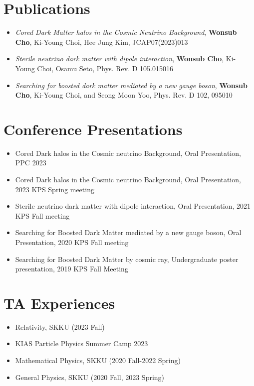\documentclass{article}
\begin{document}
\section{Publications}
\begin{itemize}
    \item \emph{Cored Dark Matter halos in the Cosmic Neutrino Background}, \textbf{Wonsub Cho}, Ki-Young Choi, Hee Jung Kim, JCAP07(2023)013
	\item \emph{Sterile neutrino dark matter with dipole interaction}, \textbf{Wonsub Cho}, Ki-Young Choi, Osamu Seto, Phys. Rev. D 105.015016
	\item \emph{Searching for boosted dark matter mediated by a new gauge boson}, \textbf{Wonsub Cho}, Ki-Young Choi, and Seong Moon Yoo, Phys. Rev. D 102, 095010
\end{itemize}

\section{Conference Presentations}
    \begin{itemize}
    \item Cored Dark halos in the Cosmic neutrino Background, Oral Presentation, PPC 2023
    \item Cored Dark halos in the Cosmic neutrino Background, Oral Presentation, 2023 KPS Spring meeting
    \item Sterile neutrino dark matter with dipole interaction, Oral Presentation, 2021 KPS Fall meeting
    \item Searching for Boosted Dark Matter mediated by a new gauge boson, Oral Presentation, 2020 KPS Fall meeting
    \item Searching for Boosted Dark Matter by cosmic ray, Undergraduate poster presentation, 2019 KPS Fall Meeting
    \end{itemize}

\section{TA Experiences}
    \begin{itemize}
        \item Relativity, SKKU (2023 Fall)
        \item KIAS Particle Physics Summer Camp 2023
    	\item Mathematical Physics, SKKU (2020 Fall-2022 Spring)
    	\item General Physics, SKKU (2020 Fall, 2023 Spring)
    \end{itemize}
\end{document}
